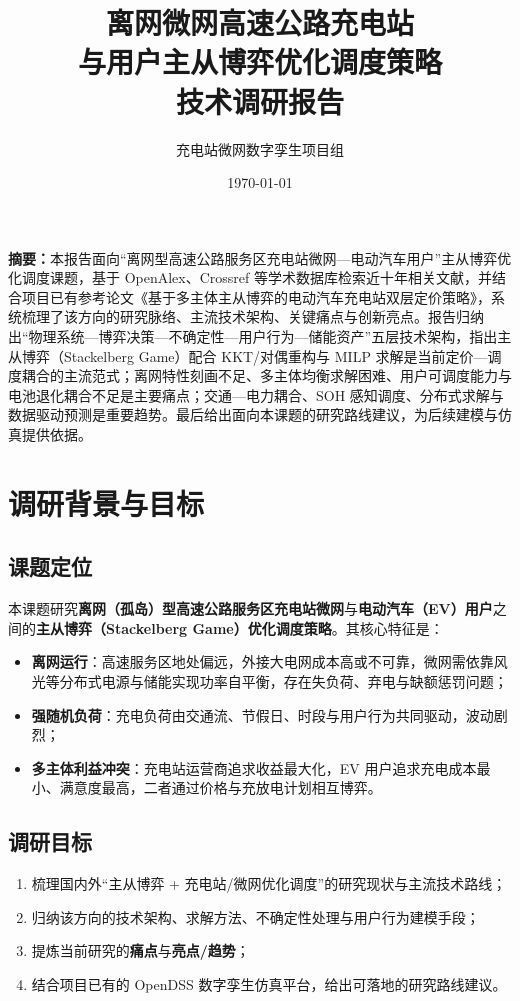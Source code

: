 \documentclass[UTF8,a4paper,11pt]{ctexart}
\title{\vspace{-1.5cm}\textbf{\color{mainblue}离网微网高速公路充电站\\与用户主从博弈优化调度策略}\\[6pt]
\large 技术调研报告}
\author{充电站微网数字孪生项目组}
\date{\today}
\begin{document}
\maketitle
\thispagestyle{fancy}

\begin{center}
\begin{minipage}{0.92\textwidth}
\small
\textbf{摘要：}本报告面向“离网型高速公路服务区充电站微网—电动汽车用户”主从博弈优化调度课题，基于 OpenAlex、Crossref 等学术数据库检索近十年相关文献，并结合项目已有参考论文《基于多主体主从博弈的电动汽车充电站双层定价策略》，系统梳理了该方向的研究脉络、主流技术架构、关键痛点与创新亮点。报告归纳出“物理系统—博弈决策—不确定性—用户行为—储能资产”五层技术架构，指出主从博弈（Stackelberg Game）配合 KKT/对偶重构与 MILP 求解是当前定价—调度耦合的主流范式；离网特性刻画不足、多主体均衡求解困难、用户可调度能力与电池退化耦合不足是主要痛点；交通—电力耦合、SOH 感知调度、分布式求解与数据驱动预测是重要趋势。最后给出面向本课题的研究路线建议，为后续建模与仿真提供依据。
\end{minipage}
\end{center}

\vspace{0.4cm}

\section{调研背景与目标}

\subsection{课题定位}
本课题研究\textbf{离网（孤岛）型高速公路服务区充电站微网}与\textbf{电动汽车（EV）用户}之间的\textbf{主从博弈（Stackelberg Game）优化调度策略}。其核心特征是：
\begin{itemize}
  \item \textbf{离网运行}：高速服务区地处偏远，外接大电网成本高或不可靠，微网需依靠风光等分布式电源与储能实现功率自平衡，存在失负荷、弃电与缺额惩罚问题；
  \item \textbf{强随机负荷}：充电负荷由交通流、节假日、时段与用户行为共同驱动，波动剧烈；
  \item \textbf{多主体利益冲突}：充电站运营商追求收益最大化，EV 用户追求充电成本最小、满意度最高，二者通过价格与充放电计划相互博弈。
\end{itemize}

\subsection{调研目标}
\begin{enumerate}
  \item 梳理国内外“主从博弈 + 充电站/微网优化调度”的研究现状与主流技术路线；
  \item 归纳该方向的技术架构、求解方法、不确定性处理与用户行为建模手段；
  \item 提炼当前研究的\textbf{痛点}与\textbf{亮点/趋势}；
  \item 结合项目已有的 OpenDSS 数字孪生仿真平台，给出可落地的研究路线建议。
\end{enumerate}
\end{document}
